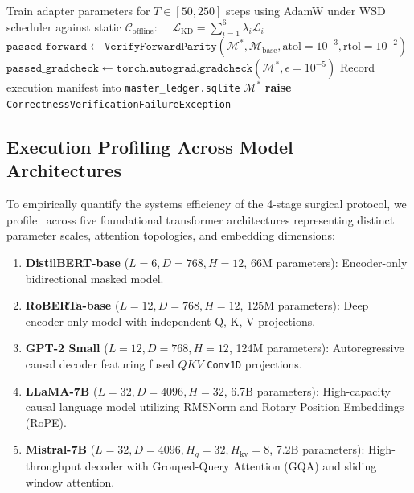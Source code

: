 \begin{algorithm}[t]
\begin{algorithmic}[1]
\STATE Train adapter parameters for $T \in [50, 250]$ steps using AdamW under WSD scheduler against static $\mathcal{C}_{\text{offline}}$:
\STATE $\quad \mathcal{L}_{\text{KD}} = \sum_{i=1}^6 \lambda_i \mathcal{L}_i$
\STATE {}
\STATE $\texttt{passed\_forward} \leftarrow \texttt{VerifyForwardParity}(\mathcal{M}^*, \mathcal{M}_{\text{base}}, \text{atol}=10^{-3}, \text{rtol}=10^{-2})$
\STATE $\texttt{passed\_gradcheck} \leftarrow \texttt{torch.autograd.gradcheck}(\mathcal{M}^*, \epsilon=10^{-5})$
    \STATE Record execution manifest into \texttt{master\_ledger.sqlite}
    \RETURN $\mathcal{M}^*$
\ELSE
    \STATE \textbf{raise} \texttt{CorrectnessVerificationFailureException}
\ENDIF
\end{algorithmic}
\end{algorithm}

\subsection{Execution Profiling Across Model Architectures}
\label{subsec:execution_profiling}

To empirically quantify the systems efficiency of the 4-stage surgical protocol, we profile \neuralops\ across five foundational transformer architectures representing distinct parameter scales, attention topologies, and embedding dimensions:
\begin{enumerate}
    \item \textbf{DistilBERT-base} ($L=6, D=768, H=12$, 66M parameters): Encoder-only bidirectional masked model.
    \item \textbf{RoBERTa-base} ($L=12, D=768, H=12$, 125M parameters): Deep encoder-only model with independent Q, K, V projections.
    \item \textbf{GPT-2 Small} ($L=12, D=768, H=12$, 124M parameters): Autoregressive causal decoder featuring fused $QKV$ \texttt{Conv1D} projections.
    \item \textbf{LLaMA-7B} ($L=32, D=4096, H=32$, 6.7B parameters): High-capacity causal language model utilizing RMSNorm and Rotary Position Embeddings (RoPE).
    \item \textbf{Mistral-7B} ($L=32, D=4096, H_q=32, H_{\text{kv}}=8$, 7.2B parameters): High-throughput decoder with Grouped-Query Attention (GQA) and sliding window attention.
\end{enumerate}

